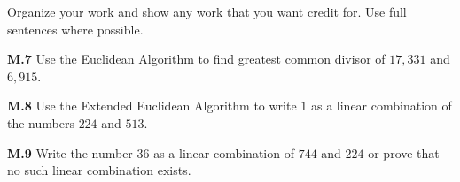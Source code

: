 \documentclass[addpoints]{exam}
\begin{document}
Organize your work and show any work that you want credit for. Use full sentences where possible.

\begin{questions}

\question \textbf{M.7}
Use the Euclidean Algorithm to find greatest common divisor of $17,331$ and $6,915$.


\question \textbf{M.8}
Use the Extended Euclidean Algorithm to write $1$ as a linear combination of the numbers $224$ and $513$.

\question \textbf{M.9}
Write the number $36$ as a linear combination of $744$ and $224$ or prove that no such linear combination exists.




\end{questions}
\end{document}
